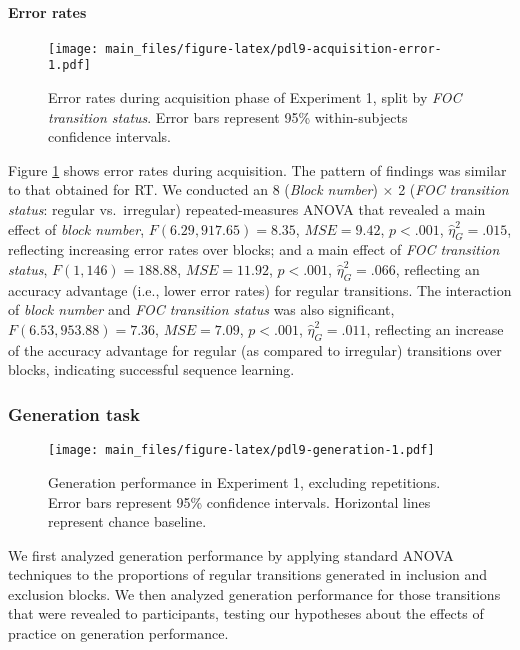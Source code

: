 \documentclass[floatsintext,doc]{apa6}
\theoremstyle{definition}
\theoremstyle{definition}
\theoremstyle{definition}
\theoremstyle{remark}
\begin{document}
\paragraph{Error rates}\label{error-rates}

\begin{figure}
\centering
\texttt{[image: main\_files/figure-latex/pdl9-acquisition-error-1.pdf]}
\caption{\label{fig:pdl9-acquisition-error}Error rates during acquisition
phase of Experiment 1, split by \emph{FOC transition status}. Error bars
represent 95\% within-subjects confidence intervals.}
\end{figure}

Figure \ref{fig:pdl9-acquisition-error} shows error rates during
acquisition. The pattern of findings was similar to that obtained for
RT. We conducted an 8 (\emph{Block number}) \(\times\) 2 (\emph{FOC
transition status}: regular vs.~irregular) repeated-measures ANOVA that
revealed a main effect of \emph{block number},
\(F(6.29, 917.65) = 8.35\), \(\mathit{MSE} = 9.42\), \(p < .001\),
\(\hat{\eta}^2_G = .015\), reflecting increasing error rates over
blocks; and a main effect of \emph{FOC transition status},
\(F(1, 146) = 188.88\), \(\mathit{MSE} = 11.92\), \(p < .001\),
\(\hat{\eta}^2_G = .066\), reflecting an accuracy advantage (i.e., lower
error rates) for regular transitions. The interaction of \emph{block
number} and \emph{FOC transition status} was also significant,
\(F(6.53, 953.88) = 7.36\), \(\mathit{MSE} = 7.09\), \(p < .001\),
\(\hat{\eta}^2_G = .011\), reflecting an increase of the accuracy
advantage for regular (as compared to irregular) transitions over
blocks, indicating successful sequence learning.

\subsubsection{Generation task}\label{generation-task}

\begin{figure}
\centering
\texttt{[image: main\_files/figure-latex/pdl9-generation-1.pdf]}
\caption{\label{fig:pdl9-generation}Generation performance in Experiment 1,
excluding repetitions. Error bars represent 95\% confidence intervals.
Horizontal lines represent chance baseline.}
\end{figure}

We first analyzed generation performance by applying standard ANOVA
techniques to the proportions of regular transitions generated in
inclusion and exclusion blocks. We then analyzed generation performance
for those transitions that were revealed to participants, testing our
hypotheses about the effects of practice on generation performance.
\end{document}
